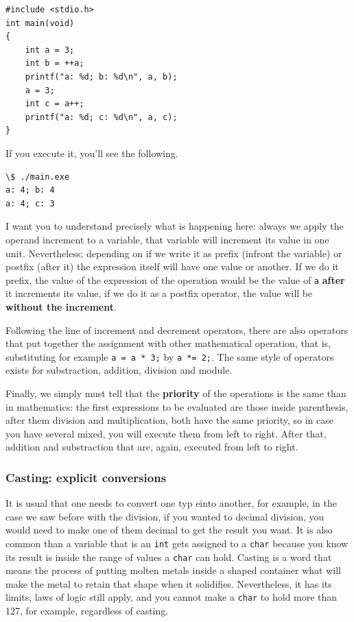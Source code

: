 \documentclass[a4paper]{article}
\begin{document}
\noindent
\begin{minipage}[H]{\linewidth}
\mbox{}
\begin{lstlisting}[style=C, caption={Increment and decrement operators},
label={lst:prefixAndPostfixOperators}]
#include <stdio.h>
int main(void)
{
    int a = 3;
    int b = ++a;
    printf("a: %d; b: %d\n", a, b);
    a = 3;
    int c = a++;
    printf("a: %d; c: %d\n", a, c);
}
\end{lstlisting}
\end{minipage}

If you execute it, you'll see the following.

\noindent
\begin{minipage}[H]{\linewidth}
\mbox{}
\begin{lstlisting}[style=terminalStyle]
\$ ./main.exe
a: 4; b: 4
a: 4; c: 3
\end{lstlisting}
\end{minipage}

I want you to understand precisely what is happening here: always we apply
the operand increment to a variable, that variable will increment
its value in one unit. Nevertheless; depending on if we write it as prefix
(infront the variable) or postfix (after it) the expression itself will have one
value or another. If we do it prefix, the value
of the expression of the operation
would be the value of \verb!a! \textbf{after} it increments its value, if we
do it as a postfix operator, the value will be \textbf{without the increment}.

Following the line of increment and decrement operators, there are also
operators that put together the assignment with other mathematical operation,
that is, substituting for example \lstinline[style=C]!a = a * 3;! by
\lstinline[style=C]!a *= 2;!. The same style of operators exists for substraction,
addition, division and module.

Finally, we simply must tell that the \textbf{priority} of the operations
is the same than in mathematics: the first expressions to be evaluated are those
inside parenthesis, after them division and multiplication, both have
the same priority, so in case you have several mixed, you will execute them
from left to right. After that, addition and substraction that are, again,
executed from left to right.

\subsubsection{Casting: explicit conversions}
It is usual that one needs to convert one typ einto another, for example, in the
case we saw before with the division, if you wanted to decimal division, you
would need to make one of them decimal to get the result you want. It is also
common than a variable that is an \texttt{int} gets assigned to a \texttt{char}
because you know its result is inside the range of values a \texttt{char} can
hold. Casting is a word that means the process of putting molten metals inside
a shaped container what will make the metal to retain that shape when it
solidifies. Nevertheless, it has its limits, laws of logic still apply, and you
cannot make a \texttt{char} to hold more than 127, for example, regardless of
casting.
\end{document}
